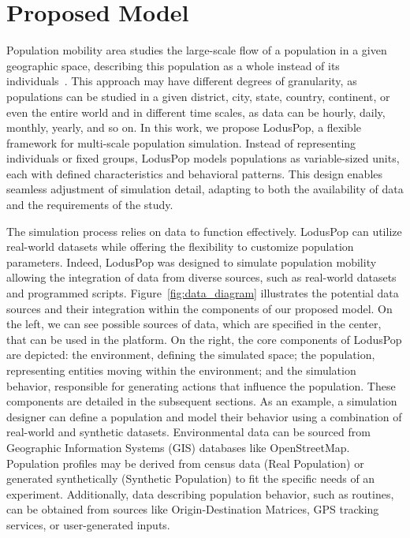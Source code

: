 \chapter{Proposed Model} 
\label{chapter:proposed_model}

Population mobility area studies the large-scale flow of a population in a given geographic space, describing this population as a whole instead of its individuals~\cite{brockmann2006scaling,gonzalez2008understanding}. This approach may have different degrees of granularity, as populations can be studied in a given district, city, state, country, continent, or even the entire world and in different time scales, as data can be hourly, daily, monthly, yearly, and so on. 
In this work, we propose LodusPop, a flexible framework for multi-scale population simulation. Instead of representing individuals or fixed groups, LodusPop models populations as variable-sized units, each with defined characteristics and behavioral patterns. This design enables seamless adjustment of simulation detail, adapting to both the availability of data and the requirements of the study.

The simulation process relies on data to function effectively. LodusPop can utilize real-world datasets while offering the flexibility to customize population parameters. Indeed, LodusPop was designed to simulate population mobility allowing the integration of data from diverse sources, such as real-world datasets and programmed scripts. 
Figure~\ref{fig:data_diagram} illustrates the potential data sources and their integration within the components of our proposed model.
On the left, we can see possible sources of data, which are specified in the center, that can be used in the platform. On the right, the core components of LodusPop are depicted: the environment, defining the simulated space; the population, representing entities moving within the environment; and the simulation behavior, responsible for generating actions that influence the population. These components are detailed in the subsequent sections. 
As an example, a simulation designer can define a population and model their behavior using a combination of real-world and synthetic datasets. Environmental data can be sourced from Geographic Information Systems (GIS) databases like OpenStreetMap. Population profiles may be derived from census data (Real Population) or generated synthetically (Synthetic Population) to fit the specific needs of an experiment. Additionally, data describing population behavior, such as routines, can be obtained from sources like Origin-Destination Matrices, GPS tracking services, or user-generated inputs.

